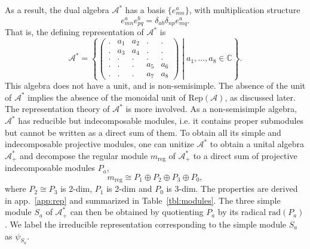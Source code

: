 \documentclass[prx, twocolumn, superscriptaddress, dvipsnames]{revtex4-2}
\theoremstyle{definition}
\newcommand{\mA}{\mathcal{A}}
\newcommand{\reg}{\text{reg}}
\newcommand{\hbnt}{a}
\begin{document}
As a result, the dual algebra $\mathcal A^*$ has a basis $\{e^a_{mn}\}$, with multiplication structure
\begin{equation}
\label{eqn:mul-As}
    e^a_{mn} e^b_{pq} = \delta_{ab} \delta_{np} e^a_{mq}.
\end{equation}
 That is, the defining representation of $\mathcal{A}^*$ is
\begin{equation*}
    \mathcal{A}^* = \left\{ \begin{pmatrix}
    .&a_1&a_2 &. &.\\
        .&a_3&a_4 &. & .\\
        .&.&.&.&.\\
         . &.&. & a_5 & a_6 \\
        .&.&. & a_7&a_8
    \end{pmatrix} \middle | a_1,\dots, a_8 \in \mathbb{C} \right\}.
\end{equation*}
This algebra does not have a unit, and is non-semisimple. The absence of the unit of $\mA^*$ implies the absence of the monoidal unit of $\mathrm{Rep}(\mA)$, as discussed later. The representation theory of $\mA^*$ is more involved. As a non-semisimple algebra, $\mA^*$ has reducible but indecomposable modules, i.e. it contains proper submodules but cannot be written as a direct sum of them. To obtain all its simple and indecomposable projective modules, one can unitize $\mA^*$ to obtain a unital algebra $\mA^*_+$ and decompose the regular module $m_\reg$ of $\mA^*_+$ to a direct sum of projective indecomposable modules $P_\hbnt$, 
\begin{equation}
m_\reg \cong P_1 \oplus P_2 \oplus P_3 \oplus P_0,    
\end{equation}
where $P_2\cong P_3$ is 2-dim, $P_1$ is 2-dim and $P_0$ is 3-dim. The properties are derived in app.~\ref{app:rep} and summarized in Table~\ref{tbl:modules}.  
The three simple module $S_\hbnt$ of $\mA^*_+$ can then be obtained by quotienting $P_\hbnt$ by its radical $\text{rad}(P_\hbnt)$. We label the irreducible representation corresponding to the simple module $S_\hbnt$ as $\psi_{S_\hbnt}$.
\end{document}

